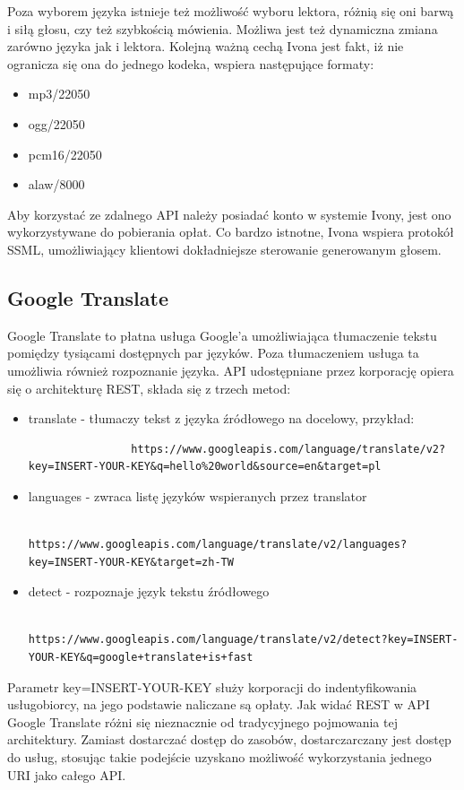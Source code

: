Poza wyborem języka istnieje też możliwość wyboru lektora, różnią się oni barwą i siłą głosu, czy też szybkością mówienia. Możliwa jest też dynamiczna zmiana zarówno języka jak i lektora. Kolejną ważną cechą Ivona jest fakt, iż nie ogranicza się ona do jednego kodeka, wspiera następujące formaty:
\begin{itemize}
	\item mp3/22050
	\item ogg/22050
	\item pcm16/22050
	\item alaw/8000
\end{itemize}
 Aby korzystać ze zdalnego API należy posiadać konto w systemie Ivony, jest ono wykorzystywane do pobierania opłat. Co bardzo istnotne, Ivona wspiera protokół SSML, umożliwiający klientowi dokładniejsze sterowanie generowanym głosem. 

\subsection{Google Translate}
Google Translate to płatna usługa Google'a umożliwiająca tłumaczenie tekstu pomiędzy tysiącami dostępnych par języków. Poza tłumaczeniem usługa ta umożliwia również rozpoznanie języka. API udostępniane przez korporację opiera się o architekturę REST, składa się z trzech metod:
\begin{itemize}
	\item translate - tłumaczy tekst z języka źródłowego na docelowy, przykład:
			\begin{lstlisting}
				https://www.googleapis.com/language/translate/v2?key=INSERT-YOUR-KEY&q=hello%20world&source=en&target=pl
			\end{lstlisting}
	\item languages - zwraca listę języków wspieranych przez translator
			\begin{lstlisting}
				https://www.googleapis.com/language/translate/v2/languages?key=INSERT-YOUR-KEY&target=zh-TW
			\end{lstlisting}
	\item detect - rozpoznaje język tekstu źródłowego
			\begin{lstlisting}
				https://www.googleapis.com/language/translate/v2/detect?key=INSERT-YOUR-KEY&q=google+translate+is+fast
			\end{lstlisting}
\end{itemize}
Parametr key=INSERT-YOUR-KEY służy korporacji do indentyfikowania usługobiorcy, na jego podstawie naliczane są opłaty. Jak widać REST w API Google Translate różni się nieznacznie od tradycyjnego pojmowania tej architektury. Zamiast dostarczać dostęp do zasobów, dostarczarczany jest dostęp do usług, stosując takie podejście uzyskano możliwość wykorzystania jednego URI jako całego API. 

